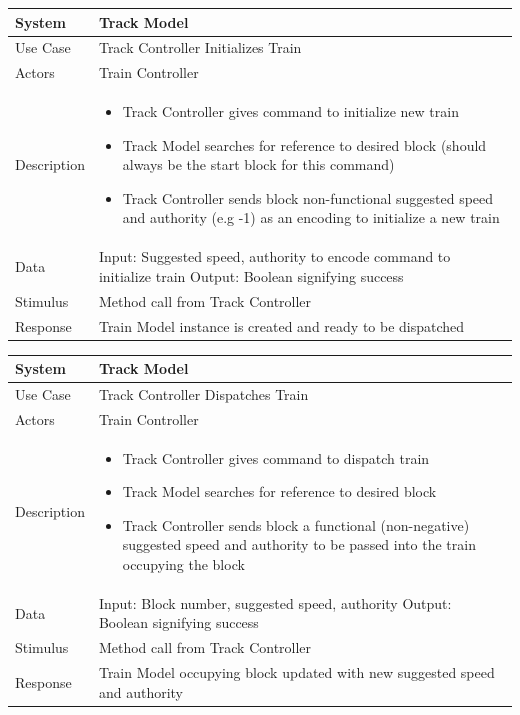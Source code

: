 \documentclass{article}
\begin{document}
    \begin{longtable}{
    || >{\raggedright\arraybackslash}m{}
    | >{\raggedright\arraybackslash}m{}||}
    \hline
    \textbf{System} & \textbf{Track Model} \\
    \hline
    Use Case & Track Controller Initializes Train\\
    \hline
    Actors & Train Controller\\
    \hline
   Description & \begin{itemize}
        \item Track Controller gives command to initialize new train
        \item Track Model searches for reference to desired block (should always be the start block for this command)
        \item Track Controller sends block non-functional suggested speed and authority (e.g -1) as an encoding to initialize a new train
    \end{itemize}\\
    \hline
    Data & Input: Suggested speed, authority to encode command to initialize train \newline Output: Boolean signifying success\\
    \hline
    Stimulus & Method call from Track Controller\\
    \hline
    Response & Train Model instance is created and ready to be dispatched\\
    \hline
    \end{longtable}
    
    \begin{longtable}{
    || >{\raggedright\arraybackslash}m{}
    | >{\raggedright\arraybackslash}m{}||}
    \hline
    \textbf{System} & \textbf{Track Model} \\
    \hline
    Use Case & Track Controller Dispatches Train\\
    \hline
    Actors & Train Controller\\
    \hline
   Description & \begin{itemize}
        \item Track Controller gives command to dispatch train
        \item Track Model searches for reference to desired block
        \item Track Controller sends block a functional (non-negative) suggested speed and authority to be passed into the train occupying the block
    \end{itemize}\\
    \hline
    Data & Input: Block number, suggested speed, authority \newline Output: Boolean signifying success\\
    \hline
    Stimulus & Method call from Track Controller\\
    \hline
    Response & Train Model occupying block updated with new suggested speed and authority\\
    \hline
    \end{longtable}
    
\end{document}
